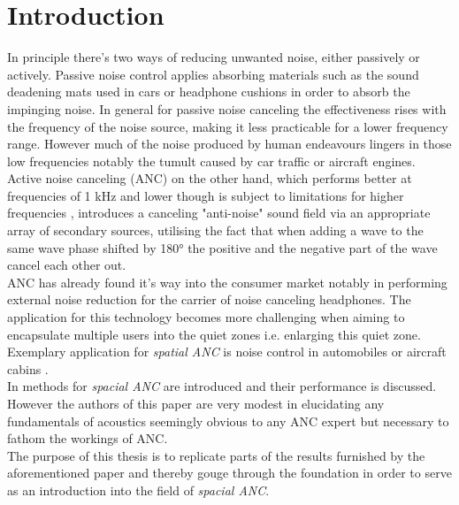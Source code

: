 \chapter{Introduction}
\label{chap:introduction}

In principle there's two ways of reducing unwanted noise, either passively or actively. Passive noise control applies absorbing materials such as the sound deadening mats used in cars or headphone cushions in order to absorb the impinging noise. In general for passive noise canceling the effectiveness rises with the frequency of the noise source, making it less practicable for a lower frequency range.\cite{Chen2017} However much of the noise produced by human endeavours lingers in those low frequencies notably the tumult caused by car traffic or aircraft engines. Active noise canceling (ANC) on the other hand, which performs better at frequencies of 1 kHz and lower though is subject to limitations for higher frequencies \cite{Kaymak2006}, introduces a canceling "anti-noise" sound field via an appropriate array of secondary sources\cite{Kuo1999}, utilising the fact that when adding a wave to the same wave phase shifted by 180° the positive and the negative part of the wave cancel each other out.\\

ANC has already found it's way into the consumer market notably in performing external noise reduction for the carrier of noise canceling headphones. The application for this technology becomes more challenging when aiming to encapsulate multiple users into the quiet zones i.e. enlarging this quiet zone. Exemplary application for \textit{spatial ANC} is noise control in automobiles or aircraft cabins \cite{Zhang2019}.\\

In \cite{Zhang2019} methods for \textit{spacial ANC} are introduced and their performance is discussed. However the authors of this paper are very modest in elucidating any fundamentals of acoustics seemingly obvious to any ANC expert but necessary to fathom the workings of ANC.\\ 
The purpose of this thesis is to replicate parts of the results furnished by the aforementioned paper and thereby gouge through the foundation in order to serve as an introduction into the field of \textit{spacial ANC}.\\

